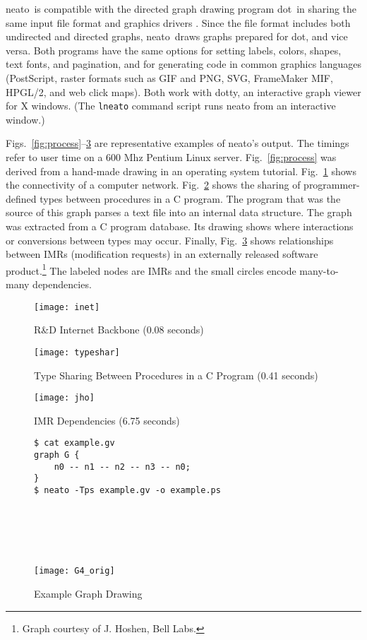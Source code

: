\documentclass[11pt]{article}
\def\dot{{\sc dot}}
\def\dotty{{\sc dotty}}
\def\neato{{\sc neato}}
\begin{document}
\neato\ is compatible with the directed graph drawing program
\dot\ in sharing the same input file format
and graphics drivers \cite{dotuserguide}.
Since the file format includes both undirected and directed graphs,
\neato\ draws graphs prepared for \dot, and vice versa.
Both programs have the same options for setting labels, colors, shapes,
text fonts, and pagination, and for generating code in common graphics
languages (PostScript, raster formats such as GIF and PNG, SVG,
FrameMaker MIF, HPGL/2, and web click maps).
Both work with \dotty, an interactive graph viewer for X windows.
(The {\tt lneato} command script runs neato from an interactive window.)

Figs.~\ref{fig:process}--\ref{fig:IMR} are representative 
examples of \neato's output.
The timings refer to user time on a 600 Mhz Pentium Linux server.
Fig.~\ref{fig:process} was derived from a hand-made drawing
in an operating system tutorial.
Fig.~\ref{fig:inet} shows the connectivity of a computer network.
Fig.~\ref{fig:typesharing} shows the sharing of programmer-defined types
between procedures in a C program.  The program that was the source
of this graph parses a text file into an internal data structure.
The graph was extracted from a C program database.  Its drawing shows
where interactions or conversions between types may occur.  Finally,
Fig.~\ref{fig:IMR} shows relationships between IMRs (modification requests)
in an externally released software product.\footnote{Graph
courtesy of J. Hoshen, Bell Labs.} The labeled nodes are IMRs and the small circles
encode many-to-many dependencies.
\begin{figure}[h]
	\centerline{\texttt{[image: inet]}}  %
	\vspace{.25in}
    \caption{R\&D Internet Backbone (0.08 seconds)}
    \label{fig:inet}
\end{figure}

\begin{figure}[h]
	\centerline{\texttt{[image: typeshar]}} %
    \caption{Type Sharing Between Procedures in a C Program (0.41 seconds)}
    \label{fig:typesharing}
\end{figure}
\begin{figure}[h]
	\centerline{\texttt{[image: jho]}}  %
	\caption{IMR Dependencies (6.75 seconds)}
	\label{fig:IMR}
\end{figure}
\clearpage

\begin{figure}[h]
\begin{minipage}[b]{2in}
\begin{verbatim}
$ cat example.gv
graph G {
    n0 -- n1 -- n2 -- n3 -- n0;
}
$ neato -Tps example.gv -o example.ps


\end{verbatim}
\end{minipage} \hspace{1.0in} \
\parbox[b]{2.5in}{
	\ \\
    \centerline{\texttt{[image: G4\_orig]}}
}
\caption{Example Graph Drawing}
\label{fig:G4_orig}
\end{figure}
\end{document}
